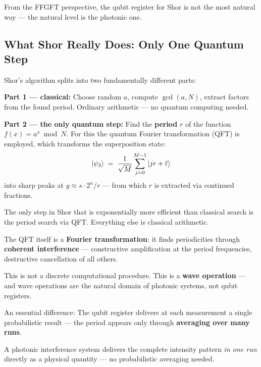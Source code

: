 From the FFGFT perspective, the qubit register for Shor is
not the most natural way ---
the natural level is the photonic one.

\subsection{What Shor Really Does: Only One Quantum Step}

Shor's algorithm splits into two fundamentally different parts:

\textbf{Part 1 --- classical:}
Choose random $a$, compute $\gcd(a, N)$,
extract factors from the found period.
Ordinary arithmetic --- no quantum computing needed.

\textbf{Part 2 --- the only quantum step:}
Find the \textbf{period} $r$ of the function
$f(x) = a^x \bmod N$.
For this the quantum Fourier transformation (QFT)
is employed, which transforms the superposition state:
\begin{equation}
  \left|\psi_3\right\rangle \;=\;
  \frac{1}{\sqrt{M}}\sum_{j=0}^{M-1} \left|jr + \ell\right\rangle
\end{equation}
into sharp peaks at $y \approx s \cdot 2^n / r$
--- from which $r$ is extracted via continued fractions.

\begin{keyresult}
The only step in Shor that is exponentially
more efficient than classical search is
the period search via QFT.
Everything else is classical arithmetic.

The QFT itself is a \textbf{Fourier transformation}:
it finds periodicities through
\textbf{coherent interference} ---
constructive amplification at the period frequencies,
destructive cancellation of all others.

This is not a discrete computational procedure.
This is a \textbf{wave operation} ---
and wave operations are the natural domain
of photonic systems, not qubit registers.

An essential difference:
The qubit register delivers at each measurement
a single probabilistic result ---
the period appears only through
\textbf{averaging over many runs}.

A photonic interference system delivers
the complete intensity pattern \emph{in one run}
directly as a physical quantity ---
no probabilistic averaging needed.
\end{keyresult}

